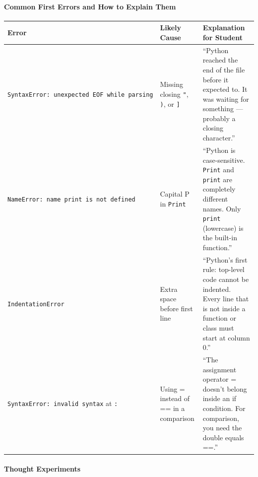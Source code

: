 \documentclass[
  justified,
  openright,
]{tufte-book}
\let\paragraph\paragraph
\let\paragraph\paragraph
\begin{document}
\paragraph{Common First Errors and How to Explain
Them}\label{common-first-errors-and-how-to-explain-them}

\begin{fullwidth}{\def\LTcaptype{none} %
\begin{longtable}[]{@{}
  >{\raggedright\arraybackslash}p{}
  >{\raggedright\arraybackslash}p{}
  >{\raggedright\arraybackslash}p{}@{}}
\toprule\noalign{}
\begin{minipage}[b]{\linewidth}\raggedright
Error
\end{minipage} & \begin{minipage}[b]{\linewidth}\raggedright
Likely Cause
\end{minipage} & \begin{minipage}[b]{\linewidth}\raggedright
Explanation for Student
\end{minipage} \\
\midrule\noalign{}
\endhead
\bottomrule\noalign{}
\endlastfoot
\texttt{SyntaxError:\ unexpected\ EOF\ while\ parsing} & Missing closing
\texttt{"}, \texttt{)}, or \texttt{{]}} & ``Python reached the end of
the file before it expected to. It was waiting for something ---
probably a closing character.'' \\
\texttt{NameError:\ name\ \textquotesingle{}print\textquotesingle{}\ is\ not\ defined}
& Capital P in \texttt{Print} & ``Python is case-sensitive.
\texttt{Print} and \texttt{print} are completely different names. Only
\texttt{print} (lowercase) is the built-in function.'' \\
\texttt{IndentationError} & Extra space before first line & ``Python's
first rule: top-level code cannot be indented. Every line that is not
inside a function or class must start at column 0.'' \\
\texttt{SyntaxError:\ invalid\ syntax} at \texttt{:} & Using = instead
of == in a comparison & ``The assignment operator = doesn't belong
inside an if condition. For comparison, you need the double equals
==.'' \\
\end{longtable}
}
\end{fullwidth}
\paragraph{Thought Experiments}\label{thought-experiments-5}
\end{document}
